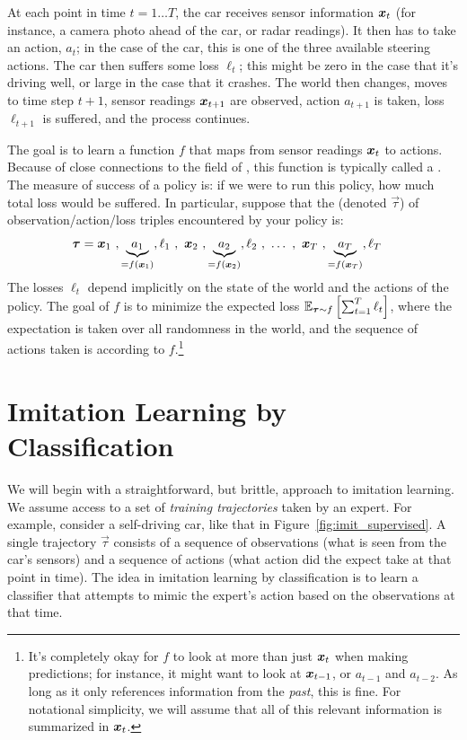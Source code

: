 At each point in time $t = 1 \dots T$, the car receives sensor information ${\boldsymbol{x}}_t$ (for instance, a camera photo ahead of the car, or radar readings).
It then has to take an action, $a_t$; in the case of the car, this is one of the three available steering actions.
The car then suffers some loss $\ell_t$; this might be zero in the case that it's driving well, or large in the case that it crashes.
The world then changes, moves to time step $t+1$, sensor readings ${\boldsymbol{x}}_{t+1}$ are observed, action $a_{t+1}$ is taken, loss $\ell_{t+1}$ is suffered, and the process continues.

The goal is to learn a function $f$ that maps from sensor readings ${\boldsymbol{x}}_t$ to actions.
Because of close connections to the field of , this function is typically called a .
The measure of success of a policy is: if we were to run this policy, how much total loss would be suffered.
In particular, suppose that the  (denoted $\vec\tau$) of observation/action/loss triples encountered by your policy is:
\begin{align}
  \boldsymbol{\tau} &=
  {\boldsymbol{x}}_1~, \underbrace{a_1}_{=f({\boldsymbol{x}}_1)}, \ell_1~,~
  {\boldsymbol{x}}_2~, \underbrace{a_2}_{=f({\boldsymbol{x}}_2)}, \ell_2~,~
  \dots~,~
  {\boldsymbol{x}}_T~, \underbrace{a_T}_{=f({\boldsymbol{x}}_T)}, \ell_T
\end{align}
The losses $\ell_t$ depend implicitly on the state of the world and the actions of the policy.
The goal of $f$ is to minimize the expected loss $\mathbb{E}_{\boldsymbol{\tau} \sim f}\left[ \sum_{t=1}^T \ell_t \right]$, where the expectation is taken over all randomness in the world, and the sequence of actions taken is according to $f$.\footnote{It's completely okay for $f$ to look at more than just ${\boldsymbol{x}}_t$ when making predictions; for instance, it might want to look at ${\boldsymbol{x}}_{t-1}$, or $a_{t-1}$ and $a_{t-2}$. As long as it only references information from the \emph{past}, this is fine. For notational simplicity, we will assume that all of this relevant information is summarized in ${\boldsymbol{x}}_t$.}

\section{Imitation Learning by Classification}

\newcommand{\vt}{\vec\tau}


We will begin with a straightforward, but brittle, approach to imitation learning.
We assume access to a set of \emph{training trajectories} taken by an expert.
For example, consider a self-driving car, like that in Figure~\ref{fig:imit_supervised}.
A single trajectory $\vt$ consists of a sequence of observations (what is seen from the car's sensors) and a sequence of actions (what action did the expect take at that point in time).
The idea in imitation learning by classification is to learn a classifier that attempts to mimic the expert's action based on the observations at that time.

